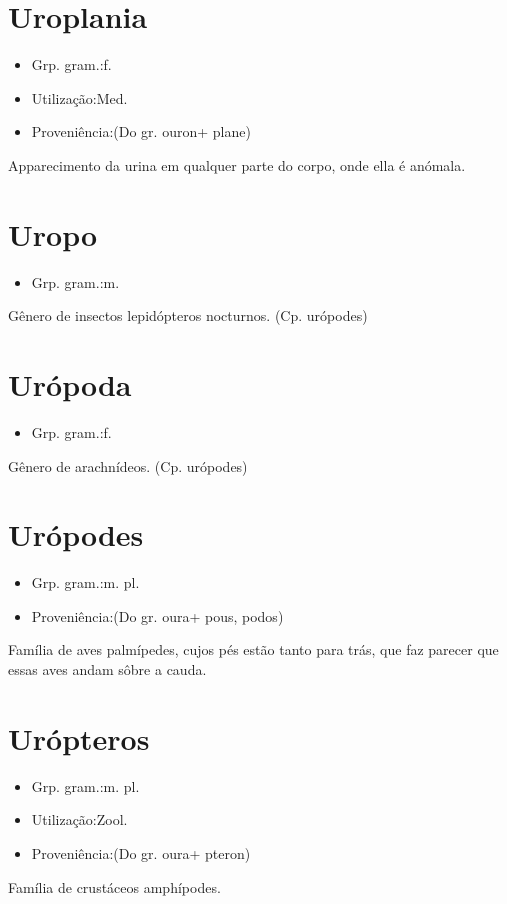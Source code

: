\documentclass{article}
\begin{document}
\section{Uroplania}
\begin{itemize}
\item {Grp. gram.:f.}
\end{itemize}
\begin{itemize}
\item {Utilização:Med.}
\end{itemize}
\begin{itemize}
\item {Proveniência:(Do gr. \textunderscore ouron\textunderscore  + \textunderscore plane\textunderscore )}
\end{itemize}
Apparecimento da urina em qualquer parte do corpo, onde ella é anómala.
\section{Uropo}
\begin{itemize}
\item {Grp. gram.:m.}
\end{itemize}
Gênero de insectos lepidópteros nocturnos.
(Cp. \textunderscore urópodes\textunderscore )
\section{Urópoda}
\begin{itemize}
\item {Grp. gram.:f.}
\end{itemize}
Gênero de arachnídeos.
(Cp. \textunderscore urópodes\textunderscore )
\section{Urópodes}
\begin{itemize}
\item {Grp. gram.:m. pl.}
\end{itemize}
\begin{itemize}
\item {Proveniência:(Do gr. \textunderscore oura\textunderscore  + \textunderscore pous\textunderscore , \textunderscore podos\textunderscore )}
\end{itemize}
Família de aves palmípedes, cujos pés estão tanto para trás, que faz parecer que essas aves andam sôbre a cauda.
\section{Urópteros}
\begin{itemize}
\item {Grp. gram.:m. pl.}
\end{itemize}
\begin{itemize}
\item {Utilização:Zool.}
\end{itemize}
\begin{itemize}
\item {Proveniência:(Do gr. \textunderscore oura\textunderscore  + \textunderscore pteron\textunderscore )}
\end{itemize}
Família de crustáceos amphípodes.
\end{document}

